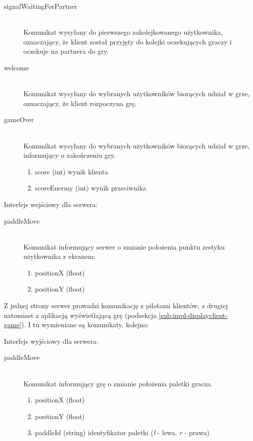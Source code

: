 \begin{description}
	\item[signalWaitingForPartner] \hfill \\
	Komunikat wysyłany do pierwszego zakolejkowanego użytkownika, oznaczający, że klient został przyjęty do kolejki oczekujących graczy i oczekuje na partnera do gry.
\end{description}

\begin{description}
	\item[welcome] \hfill \\
	Komunikat wysyłany do wybranych użytkowników biorących udział w grze, oznaczający, że klient rozpoczyna grę.
\end{description}

\begin{description}
	\item[gameOver] \hfill \\
	Komunikat wysyłany do wybranych użytkowników biorących udział w grze, informujący o zakończeniu gry.
	\begin{enumerate}
		\item score (int) wynik klienta
		\item scoreEnermy (int) wynik przeciwnika
	\end{enumerate}
\end{description}

Interfejs wejściowy dla serwera:

\begin{description}
	\item[paddleMove] \hfill \\
	Komunikat informujący serwer o zmianie położenia punktu zestyku użytkownika z ekranem:
	\begin{enumerate}
		\item positionX (float)
		\item positionY (float)
	\end{enumerate}
\end{description}

Z jednej strony serwer prowadzi komunikację z pilotami klientów, z drugiej natomiast z aplikacją wyświetlającą grę (podsekcja \ref{sub:impl-displayclient-game}). I tu wymieniane są komunikaty, kolejno:

Interfejs wyjściowy dla serwera:

\begin{description}
	\item[paddleMove] \hfill \\
	Komunikat informujący grę o zmianie położenia paletki gracza.
	\begin{enumerate}
		\item positionX (float)
		\item positionY (float)
		\item paddleId (string) identyfikator paletki (\emph{l} - lewa, \emph{r} - prawa)
	\end{enumerate}
\end{description}

